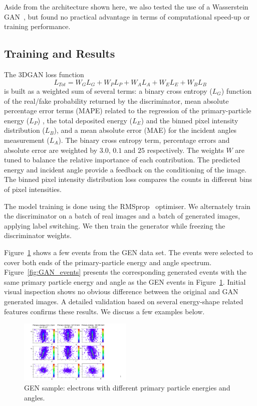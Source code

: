Aside from the architecture shown here, we also tested the use of a Wasserstein GAN~\cite{wgan}, but found no practical advantage in terms of computational speed-up or training performance.

\subsection{Training and Results}
The 3DGAN loss function
\begin{equation}
    L_{Tot} = W_{G}L_{G} + W_{P}L_{P} + W_{A}L_{A} + W_{E}L_{E} + W_{B}L_{B} 
\label{eq:loss}
\end{equation}
is built as a weighted sum of several terms: a binary cross entropy ($L_{G}$) function of the real/fake probability returned by the discriminator, mean absolute percentage error terms (MAPE) related to the regression of the primary-particle energy ($L_{P}$) , the total deposited energy ($L_{E}$) and the binned pixel intensity distribution ($L_{B}$), and a mean absolute error (MAE) for the incident angles measurement ($L_{A}$). The binary cross entropy term, percentage errors and absolute error are weighted by $3.0$, $0.1$ and $25$ respectively. The weights $W$ are tuned to balance the relative importance of each contribution. The predicted energy and incident angle provide a feedback on the conditioning of the image. The binned pixel intensity distribution loss compares the counts in different bins of pixel intensities. 

The model training is done using the RMSprop~\cite{rmsProp} optimiser. We alternately train the discriminator on a batch of real images and a batch of generated images, applying label switching. We then train the generator while freezing the discriminator weights.

Figure~\ref{fig:GEANT4_events} shows a few events from the GEN data set. The events were selected to cover both ends of the primary-particle energy and angle spectrum. Figure~\ref{fig:GAN_events} presents the corresponding generated events with the same primary particle energy and angle as the GEN events in Figure~\ref{fig:GEANT4_events}. Initial visual inspection shows no obvious difference between the original and GAN generated images. A detailed validation based on several energy-shape related features confirms these results. We discuss a few examples below.

\begin{figure}[htbp]
    \includegraphics[width=0.48\textwidth]{Images/Calo/GAN_g4_events.pdf}
    \caption{GEN sample: electrons with different primary particle energies and angles.}
    \label{fig:GEANT4_events}
\end{figure}

